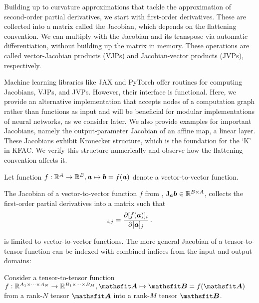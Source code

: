 Building up to curvature approximations that tackle the approximation of second-order partial derivatives, we start with first-order derivatives.
These are collected into a matrix called the Jacobian, which depends on the flattening convention.
We can multiply with the Jacobian and its transpose via automatic differentiation, without building up the matrix in memory.
These operations are called vector-Jacobian products (VJPs) and Jacobian-vector products (JVPs), respectively.

Machine learning libraries like JAX and PyTorch offer routines for computing Jacobians, VJPs, and JVPs.
However, their interface is functional.
Here, we provide an alternative implementation that accepts nodes of a computation graph rather than functions as input and will be beneficial for modular implementations of neural networks, as we consider later.
We also provide examples for important Jacobians, namely the output-parameter Jacobian of an affine map, \ie a linear layer.
These Jacobians exhibit Kronecker structure, which is the foundation for the `K' in KFAC.
We verify this structure numerically and observe how the flattening convention affects it.

\begin{setup}\label{setup:vector_to_vector_function}
  Let function $f: {\mathbb{R}}^A \to {\mathbb{R}}^B, {\bm{a}} \mapsto {\bm{b}} = f({\bm{a}})$ denote a vector-to-vector function.
\end{setup}

\begin{definition}\label{def:vector_jacobian}
  The Jacobian of a vector-to-vector function $f$ from , $\mathrm{J}_{{\bm{a}}}{\bm{b}} \in {\mathbb{R}}^{B \times A}$, collects the first-order partial derivatives into a matrix such that
  \begin{align*}
    [\jac_{\va} \vb]_{i,j} = \frac{\partial [f(\va)]_i}{\partial [\va]_j}\,.
  \end{align*}
\end{definition}
 is limited to vector-to-vector functions.
The more general Jacobian of a tensor-to-tensor function can be indexed with combined indices from the input and output domains:

\begin{setup}\label{setup:jacobians}
  Consider a tensor-to-tensor function $f: \sR^{A_1 \times \dots \times A_N} \to \sR^{B_1 \times \dots \times B_M}, \tA \mapsto \tB = f(\tA)$ from a rank-$N$ tensor $\tA$ into a rank-$M$ tensor $\tB$.
\end{setup}


